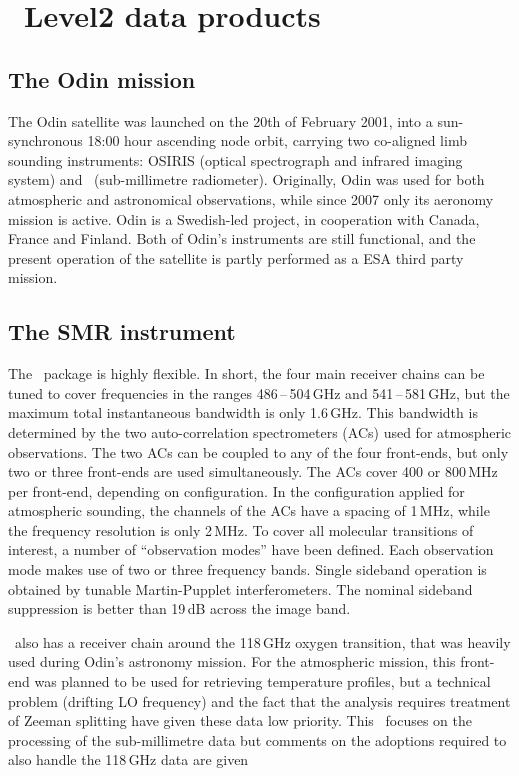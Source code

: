 \chapter{\smr\ Level2 data products}

\section{The Odin mission}
\label{sec:odin}
%

The Odin satellite was launched on the 20th of February 2001, into a sun-synchronous
18:00 hour ascending node orbit, carrying two co-aligned limb sounding
instruments: OSIRIS (optical spectrograph and infrared imaging system) and
\SMR\ (sub-millimetre radiometer). Originally, Odin was used for both
atmospheric and astronomical observations, while since 2007 only its aeronomy
mission is active. Odin is a Swedish-led project, in cooperation with Canada,
France and Finland. Both of Odin's instruments are still functional, and the
present operation of the satellite is partly performed as a ESA third party
mission.

\section{The SMR instrument}

The \smr\ package is highly flexible. In short, the four main receiver chains
can be tuned to cover frequencies in the ranges 486\,--\,504\,GHz and
541\,--\,581\,GHz, but the maximum total instantaneous bandwidth is only
1.6\,GHz. This bandwidth is determined by the two auto-correlation
spectrometers (ACs) used for atmospheric observations. The two ACs can be
coupled to any of the four front-ends, but only two or three front-ends are
used simultaneously. The ACs cover 400 or 800\,MHz per front-end, depending on
configuration. In the configuration applied for atmospheric sounding, the
channels of the ACs have a spacing of 1\,MHz, while the frequency resolution is
only 2\,MHz.
To cover all molecular transitions
of interest, a number of ``observation modes'' have been defined. Each
observation mode makes use of two or three frequency bands. Single sideband
operation is obtained by tunable Martin-Pupplet interferometers. The nominal
sideband suppression is better than 19\,dB across the image band.

\smr\ also has a receiver chain around the 118\,GHz oxygen transition, that was
heavily used during Odin's astronomy mission. For the atmospheric mission, this
front-end was planned to be used for retrieving temperature profiles, but a
technical problem (drifting LO frequency) and the fact that the analysis
requires treatment of Zeeman splitting have given these data low priority. This
\ATBD\ focuses on the processing of the sub-millimetre data but comments on the
adoptions required to also handle the 118\,GHz data are given

